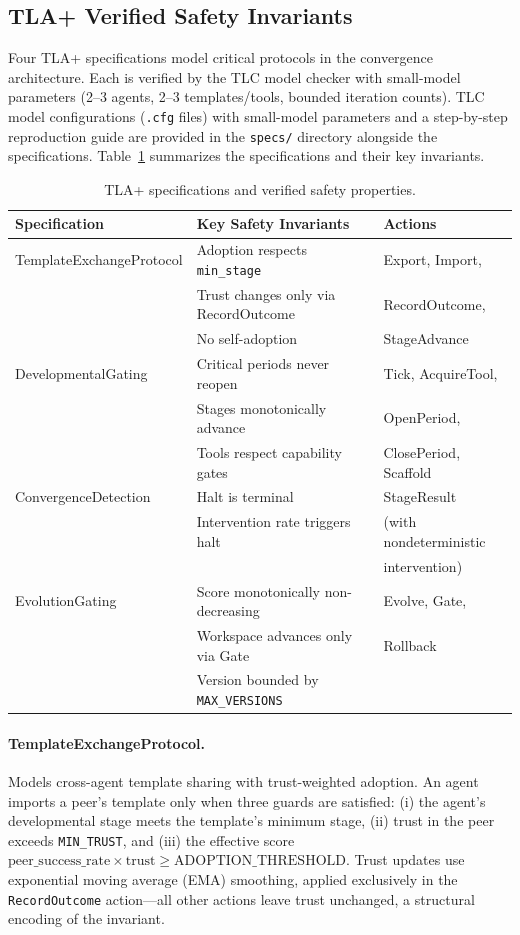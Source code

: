 \documentclass[11pt]{article}
\begin{document}
\subsection{TLA+ Verified Safety Invariants}\label{sec:tla}

Four TLA+ specifications model critical protocols in the convergence
architecture.  Each is verified by the TLC model checker with small-model
parameters (2--3 agents, 2--3 templates/tools, bounded iteration
counts).  TLC model configurations (\texttt{.cfg} files) with small-model
parameters and a step-by-step reproduction guide are provided in the
\texttt{specs/} directory alongside the specifications.
Table~\ref{tab:tla} summarizes the specifications and their key
invariants.

\begin{table}[ht]
\centering
\caption{TLA+ specifications and verified safety properties.}
\label{tab:tla}
\small
\begin{tabular}{@{}lll@{}}
\toprule
\textbf{Specification} & \textbf{Key Safety Invariants} & \textbf{Actions} \\
\midrule
TemplateExchangeProtocol
  & Adoption respects \texttt{min\_stage}
  & Export, Import, \\
  & Trust changes only via RecordOutcome
  & RecordOutcome, \\
  & No self-adoption
  & StageAdvance \\
\addlinespace
DevelopmentalGating
  & Critical periods never reopen
  & Tick, AcquireTool, \\
  & Stages monotonically advance
  & OpenPeriod, \\
  & Tools respect capability gates
  & ClosePeriod, Scaffold \\
\addlinespace
ConvergenceDetection
  & Halt is terminal
  & StageResult \\
  & Intervention rate triggers halt
  & (with nondeterministic \\
  &
  & intervention) \\
\addlinespace
EvolutionGating
  & Score monotonically non-decreasing
  & Evolve, Gate, \\
  & Workspace advances only via Gate
  & Rollback \\
  & Version bounded by \texttt{MAX\_VERSIONS}
  & \\
\bottomrule
\end{tabular}
\end{table}

\paragraph{TemplateExchangeProtocol.}
Models cross-agent template sharing with trust-weighted adoption.
An agent imports a peer's template only when three guards are satisfied:
(i) the agent's developmental stage meets the template's minimum stage,
(ii) trust in the peer exceeds \texttt{MIN\_TRUST}, and (iii) the
effective score $\text{peer\_success\_rate} \times \text{trust} \geq
\text{ADOPTION\_THRESHOLD}$.  Trust updates use exponential moving
average (EMA) smoothing, applied exclusively in the \texttt{RecordOutcome}
action---all other actions leave trust unchanged, a structural encoding of
the invariant.
\end{document}

